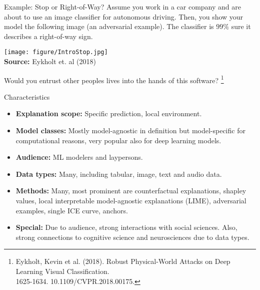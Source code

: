\documentclass[11pt,compress,t,notes=noshow, aspectratio=169, xcolor=table]{beamer}
\begin{document}
\begin{vbframe}{Example: Stop or Right-of-Way?}
Assume you work in a car company and are about to use an image classifier for autonomous driving. Then, you show your model the following image (an adversarial example). The classifier is $99\%$ sure it describes a right-of-way sign.
	\begin{center}
		\texttt{[image: figure/IntroStop.jpg]}\\
		{\tiny \textbf{Source:} Eykholt et. al (2018)}
	\end{center}
	Would you entrust other peoples lives into the hands of this software?
	\footnote[frame]{Eykholt, Kevin et al. (2018). Robust Physical-World Attacks on Deep Learning Visual Classification. \\1625-1634. 10.1109/CVPR.2018.00175.}
\end{vbframe}

\begin{vbframe}{Characteristics}
	\begin{itemize}
		\item \textbf{Explanation scope:} Specific prediction, local environment.
		\item \textbf{Model classes:} Mostly model-agnostic in definition but model-specific for computational reasons, very popular also for deep learning models.
		\item \textbf{Audience:} ML modelers and laypersons.
		\item \textbf{Data types:} Many, including tabular, image, text and audio data.
		\item \textbf{Methods:} Many, most prominent are counterfactual explanations, shapley values, local interpretable model-agnostic explanations (LIME), adversarial examples, single ICE curve, anchors.
		\item \textbf{Special:} Due to audience, strong interactions with social sciences. Also, strong connections to cognitive science and neurosciences due to data types.
	\end{itemize}
\end{vbframe}
\end{document}
